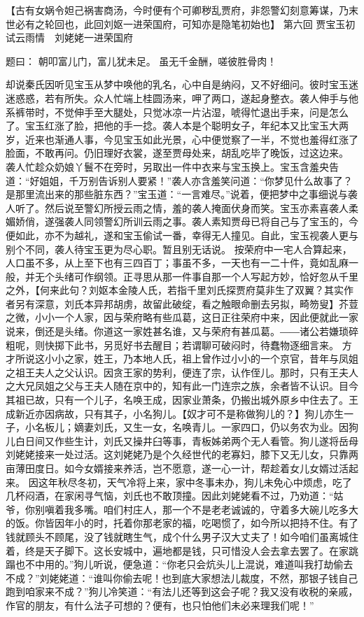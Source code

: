 \documentclass[12pt,oneside]{book}
\begin{document}
 
【古有女娲令妲己祸害商汤，今时便有个可卿秽乱贾府，非怨警幻刻意筹谋，乃末世必有之轮回也，此回刘妪一进荣国府，可知亦是隐笔初始也】
第六回  贾宝玉初试云雨情　刘姥姥一进荣国府

题曰：
朝叩富儿门，富儿犹未足。
虽无千金酬，嗟彼胜骨肉！

却说秦氏因听见宝玉从梦中唤他的乳名，心中自是纳闷，又不好细问。彼时宝玉迷迷惑惑，若有所失。众人忙端上桂圆汤来，呷了两口，遂起身整衣。袭人伸手与他系裤带时，不觉伸手至大腿处，只觉冰凉一片沾湿，唬得忙退出手来，问是怎么了。宝玉红涨了脸，把他的手一捻。袭人本是个聪明女子，年纪本又比宝玉大两岁，近来也渐通人事，今见宝玉如此光景，心中便觉察了一半，不觉也羞得红涨了脸面，不敢再问。仍旧理好衣裳，遂至贾母处来，胡乱吃毕了晚饭，过这边来。
袭人忙趁众奶娘丫鬟不在旁时，另取出一件中衣来与宝玉换上。宝玉含羞央告道：“好姐姐，千万别告诉别人要紧！”袭人亦含羞笑问道：“你梦见什么故事了？是那里流出来的那些脏东西？”宝玉道：“一言难尽。”说着，便把梦中之事细说与袭人听了。然后说至警幻所授云雨之情，羞的袭人掩面伏身而笑。宝玉亦素喜袭人柔媚娇俏，遂强袭人同领警幻所训云雨之事。袭人素知贾母已将自己与了宝玉的，今便如此，亦不为越礼，遂和宝玉偷试一番，幸得无人撞见。自此，宝玉视袭人更与别个不同，袭人待宝玉更为尽心职。暂且别无话说。
按荣府中一宅人合算起来，人口虽不多，从上至下也有三四百丁；事虽不多，一天也有一二十件，竟如乱麻一般，并无个头绪可作纲领。正寻思从那一件事自那一个人写起方妙，恰好忽从千里之外，【何来此句？刘妪本金陵人氏，若指千里刘氏探贾府莫非生了双翼？其实作者另有深意，刘氏本异邦胡虏，故留此破绽，看之触眼命删去另拟，畸笏叟】芥荳之微，小小一个人家，因与荣府略有些瓜葛，这日正往荣府中来，因此便就此一家说来，倒还是头绪。你道这一家姓甚名谁，又与荣府有甚瓜葛。――诸公若嫌琐碎粗呢，则快掷下此书，另觅好书去醒目；若谓聊可破闷时，待蠢物逐细言来。
方才所说这小小之家，姓王，乃本地人氏，祖上曾作过小小的一个京官，昔年与凤姐之祖王夫人之父认识。因贪王家的势利，便连了宗，认作侄儿。那时，只有王夫人之大兄凤姐之父与王夫人随在京中的，知有此一门连宗之族，余者皆不认识。目今其祖已故，只有一个儿子，名唤王成，因家业萧条，仍搬出城外原乡中住去了。王成新近亦因病故，只有其子，小名狗儿。【奴才可不是称做狗儿的？】狗儿亦生一子，小名板儿；嫡妻刘氏，又生一女，名唤青儿。一家四口，仍以务农为业。因狗儿白日间又作些生计，刘氏又操井臼等事，青板姊弟两个无人看管。狗儿遂将岳母刘姥姥接来一处过活。这刘姥姥乃是个久经世代的老寡妇，膝下又无儿女，只靠两亩薄田度日。如今女婿接来养活，岂不愿意，遂一心一计，帮趁着女儿女婿过活起来。
因这年秋尽冬初，天气冷将上来，家中冬事未办，狗儿未免心中烦虑，吃了几杯闷酒，在家闲寻气恼，刘氏也不敢顶撞。因此刘姥姥看不过，乃劝道：“姑爷，你别嗔着我多嘴。咱们村庄人，那一个不是老老诚诚的，守着多大碗儿吃多大的饭。你皆因年小的时，托着你那老家的福，吃喝惯了，如今所以把持不住。有了钱就顾头不顾尾，没了钱就瞎生气，成个什么男子汉大丈夫了！如今咱们虽离城住着，终是天子脚下。这长安城中，遍地都是钱，只可惜没人会去拿去罢了。在家跳蹋也不中用的。”狗儿听说，便急道：“你老只会炕头儿上混说，难道叫我打劫偷去不成？”刘姥姥道：“谁叫你偷去呢！也到底大家想法儿裁度，不然，那银子钱自己跑到咱家来不成？”狗儿冷笑道：“有法儿还等到这会子呢？我又没有收税的亲戚，作官的朋友，有什么法子可想的？便有，也只怕他们未必来理我们呢！”
\end{document}
